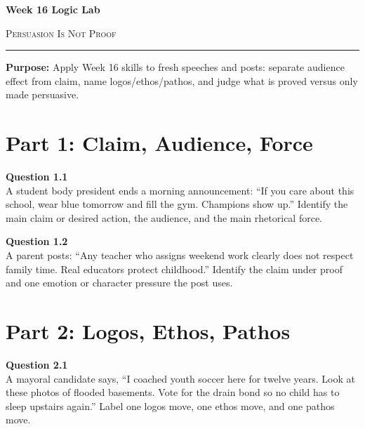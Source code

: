 \documentclass[12pt]{article}
\begin{document}
\begin{center}
{\LARGE\bfseries Week 16 Logic Lab}\par\vspace{0.05em}
{\large\scshape Persuasion Is Not Proof}\par\vspace{0.1em}
\rule{0.78\textwidth}{0.5pt}\par\vspace{0.15em}
\end{center}

\noindent\textbf{Purpose:} Apply Week 16 skills to fresh speeches and posts: separate audience effect from claim, name logos/ethos/pathos, and judge what is proved versus only made persuasive.

\vspace{0.3em}

\section*{Part 1: Claim, Audience, Force}

\textbf{Question 1.1}\\[-0.15em]
A student body president ends a morning announcement: ``If you care about this school, wear blue tomorrow and fill the gym. Champions show up.'' Identify the main claim or desired action, the audience, and the main rhetorical force.


\Needspace{3.2in}
\textbf{Question 1.2}\\[-0.15em]
A parent posts: ``Any teacher who assigns weekend work clearly does not respect family time. Real educators protect childhood.'' Identify the claim under proof and one emotion or character pressure the post uses.


\newpage

\section*{Part 2: Logos, Ethos, Pathos}

\textbf{Question 2.1}\\[-0.15em]
A mayoral candidate says, ``I coached youth soccer here for twelve years. Look at these photos of flooded basements. Vote for the drain bond so no child has to sleep upstairs again.'' Label one logos move, one ethos move, and one pathos move.
\end{document}

